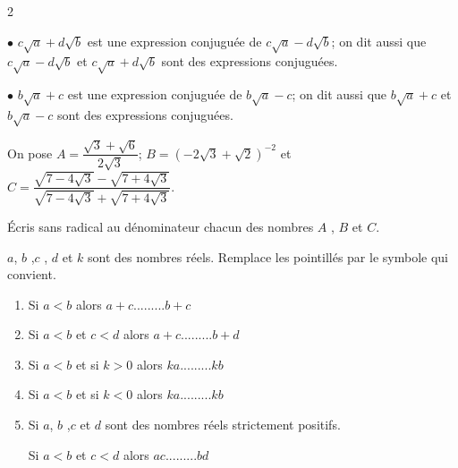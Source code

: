\begin{multicols*}{2}
{  		$\bullet$  $c\sqrt{a}+d\sqrt{b}$ est une expression conjuguée de  $c\sqrt{a}-d\sqrt{b}$; on dit aussi que $c\sqrt{a}-d\sqrt{b}$ et $c\sqrt{a}+d\sqrt{b}$ sont des expressions conjuguées.
  		
  		$\bullet$  $b\sqrt{a}+c$ est une expression conjuguée de  $b\sqrt{a}-c$; on dit aussi que $b\sqrt{a}+c$ et $b\sqrt{a}-c$ sont des expressions conjuguées.
  	}
  	
  	
  	
  	On pose $A=\dfrac{\sqrt{3}+\sqrt{6}}{2\sqrt{3}}$; $B=\left(-2\sqrt{3}+\sqrt{2} \right)^{-2}$ et $C= \dfrac{\sqrt{7-4\sqrt{3}}-\sqrt{7+4\sqrt{3}}}{\sqrt{7-4\sqrt{3}}+\sqrt{7+4\sqrt{3}}}$.
  	
  	Écris sans radical au dénominateur chacun des nombres $A$
  	, $B$ et $C$.
  	
  	\dures
  	
  	
  	$a$, $b$ ,$c$ , $d$ et $k$ sont des nombres réels. Remplace les pointillés par le symbole qui convient.
  	\begin{enumerate}
  		\item Si $a<b$ alors $a+c ......... b+c$
  		\item Si $a<b$ et $c<d$ alors $a+c ......... b+d$
  		\item Si $a<b$ et si $k>0$ alors $ka ......... kb$
  		\item Si $a<b$ et si $k<0$ alors $ka ......... kb$
  		\item Si $a$, $b$ ,$c$ et $d$  sont des nombres réels strictement positifs.
  		
  		Si $a<b$ et $c<d$ alors $ac ......... bd$
  	\end{enumerate}
  	\dures
  	
\end{multicols*}
